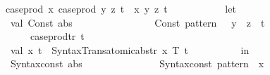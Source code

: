 \begin{isabellebody}
\ \ \ \ \ \ \ \ \ \ {\isacharparenleft}{\kern0pt}{\isacharasterisk}{\kern0pt}\ case{\isacharunderscore}{\kern0pt}prod\ {\isacharparenleft}{\kern0pt}{\isasymlambda}x{\isachardot}{\kern0pt}\ {\isacharparenleft}{\kern0pt}case{\isacharunderscore}{\kern0pt}prod\ {\isacharparenleft}{\kern0pt}{\isasymlambda}y\ z{\isachardot}{\kern0pt}\ t{\isacharparenright}{\kern0pt}{\isacharparenright}{\kern0pt}{\isacharparenright}{\kern0pt}\ {\isasymRightarrow}\ {\isasymlambda}{\isacharparenleft}{\kern0pt}x{\isacharcomma}{\kern0pt}\ y{\isacharcomma}{\kern0pt}\ z{\isacharparenright}{\kern0pt}{\isachardot}{\kern0pt}\ t\ {\isacharasterisk}{\kern0pt}{\isacharparenright}{\kern0pt}\isanewline
\ \ \ \ \ \ \ \ \ \ let\isanewline
\ \ \ \ \ \ \ \ \ \ \ \ val\ Const\ {\isacharparenleft}{\kern0pt}\isactrlsyntaxUNDERSCOREconst {\isasymopen}{\isacharunderscore}{\kern0pt}abs{\isasymclose}{\isacharcomma}{\kern0pt}\ {\isacharunderscore}{\kern0pt}{\isacharparenright}{\kern0pt}\ {\isachardollar}{\kern0pt}\isanewline
\ \ \ \ \ \ \ \ \ \ \ \ \ \ {\isacharparenleft}{\kern0pt}Const\ {\isacharparenleft}{\kern0pt}\isactrlsyntaxUNDERSCOREconst {\isasymopen}{\isacharunderscore}{\kern0pt}pattern{\isasymclose}{\isacharcomma}{\kern0pt}\ {\isacharunderscore}{\kern0pt}{\isacharparenright}{\kern0pt}\ {\isachardollar}{\kern0pt}\ y\ {\isachardollar}{\kern0pt}\ z{\isacharparenright}{\kern0pt}\ {\isachardollar}{\kern0pt}\ t{\isacharprime}{\kern0pt}\ {\isacharequal}{\kern0pt}\isanewline
\ \ \ \ \ \ \ \ \ \ \ \ \ \ \ \ case{\isacharunderscore}{\kern0pt}prod{\isacharunderscore}{\kern0pt}tr{\isacharprime}{\kern0pt}\ {\isacharbrackleft}{\kern0pt}t{\isacharbrackright}{\kern0pt}{\isacharsemicolon}{\kern0pt}\isanewline
\ \ \ \ \ \ \ \ \ \ \ \ val\ {\isacharparenleft}{\kern0pt}x{\isacharprime}{\kern0pt}{\isacharcomma}{\kern0pt}\ t{\isacharprime}{\kern0pt}{\isacharprime}{\kern0pt}{\isacharparenright}{\kern0pt}\ {\isacharequal}{\kern0pt}\ Syntax{\isacharunderscore}{\kern0pt}Trans{\isachardot}{\kern0pt}atomic{\isacharunderscore}{\kern0pt}abs{\isacharunderscore}{\kern0pt}tr{\isacharprime}{\kern0pt}\ {\isacharparenleft}{\kern0pt}x{\isacharcomma}{\kern0pt}\ T{\isacharcomma}{\kern0pt}\ t{\isacharprime}{\kern0pt}{\isacharparenright}{\kern0pt}{\isacharsemicolon}{\kern0pt}\isanewline
\ \ \ \ \ \ \ \ \ \ in\isanewline
\ \ \ \ \ \ \ \ \ \ \ \ Syntax{\isachardot}{\kern0pt}const\ \isactrlsyntaxUNDERSCOREconst {\isasymopen}{\isacharunderscore}{\kern0pt}abs{\isasymclose}\ {\isachardollar}{\kern0pt}\isanewline
\ \ \ \ \ \ \ \ \ \ \ \ \ \ {\isacharparenleft}{\kern0pt}Syntax{\isachardot}{\kern0pt}const\ \isactrlsyntaxUNDERSCOREconst {\isasymopen}{\isacharunderscore}{\kern0pt}pattern{\isasymclose}\ {\isachardollar}{\kern0pt}\ x{\isacharprime}{\kern0pt}\ {\isachardollar}{\kern0pt}\isanewline

\end{isabellebody}
